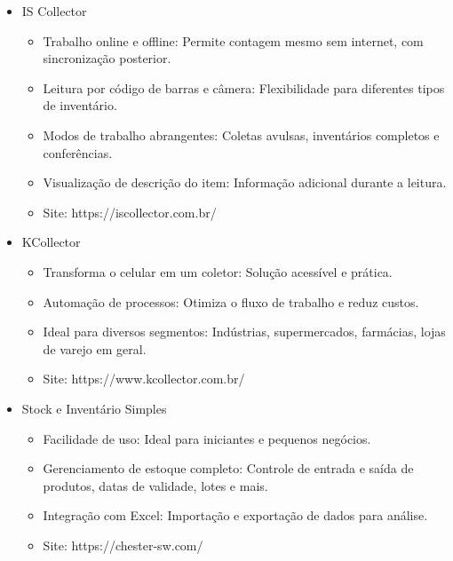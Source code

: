 \begin{itemize}
    \item IS Collector
    \begin{itemize}
        \item Trabalho online e offline: Permite contagem mesmo sem internet, com sincronização posterior.
        \item Leitura por código de barras e câmera: Flexibilidade para diferentes tipos de inventário.
        \item Modos de trabalho abrangentes: Coletas avulsas, inventários completos e conferências.
        \item Visualização de descrição do item: Informação adicional durante a leitura.
        \item Site: https://iscollector.com.br/
    \end{itemize}
    \item KCollector
    \begin{itemize}
        \item Transforma o celular em um coletor: Solução acessível e prática.
        \item Automação de processos: Otimiza o fluxo de trabalho e reduz custos.
        \item Ideal para diversos segmentos: Indústrias, supermercados, farmácias, lojas de varejo em geral.
        \item Site: https://www.kcollector.com.br/
    \end{itemize}
    \item Stock e Inventário Simples
    \begin{itemize}
        \item Facilidade de uso: Ideal para iniciantes e pequenos negócios.
        \item Gerenciamento de estoque completo: Controle de entrada e saída de produtos, datas de validade, lotes e mais.
        \item Integração com Excel: Importação e exportação de dados para análise.
        \item Site: https://chester-sw.com/
    \end{itemize}
\end{itemize}



